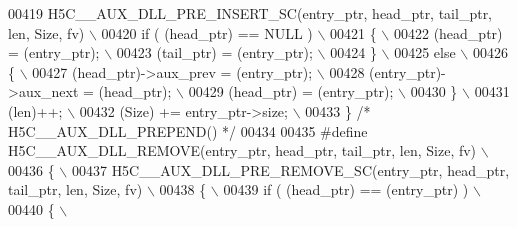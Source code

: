 \begin{DoxyCode}
00419 \textcolor{preprocessor}{    H5C\_\_AUX\_DLL\_PRE\_INSERT\_SC(entry\_ptr, head\_ptr, tail\_ptr, len, Size, fv) \(\backslash\)}
00420 \textcolor{preprocessor}{    if ( (head\_ptr) == NULL )                                                \(\backslash\)}
00421 \textcolor{preprocessor}{    \{                                                                        \(\backslash\)}
00422 \textcolor{preprocessor}{       (head\_ptr) = (entry\_ptr);                                             \(\backslash\)}
00423 \textcolor{preprocessor}{       (tail\_ptr) = (entry\_ptr);                                             \(\backslash\)}
00424 \textcolor{preprocessor}{    \}                                                                        \(\backslash\)}
00425 \textcolor{preprocessor}{    else                                                                     \(\backslash\)}
00426 \textcolor{preprocessor}{    \{                                                                        \(\backslash\)}
00427 \textcolor{preprocessor}{       (head\_ptr)->aux\_prev = (entry\_ptr);                                   \(\backslash\)}
00428 \textcolor{preprocessor}{       (entry\_ptr)->aux\_next = (head\_ptr);                                   \(\backslash\)}
00429 \textcolor{preprocessor}{       (head\_ptr) = (entry\_ptr);                                             \(\backslash\)}
00430 \textcolor{preprocessor}{    \}                                                                        \(\backslash\)}
00431 \textcolor{preprocessor}{    (len)++;                                                                 \(\backslash\)}
00432 \textcolor{preprocessor}{    (Size) += entry\_ptr->size;                                               \(\backslash\)}
00433 \textcolor{preprocessor}{\} }\textcolor{comment}{/* H5C\_\_AUX\_DLL\_PREPEND() */}\textcolor{preprocessor}{}
00434 
00435 \textcolor{preprocessor}{#define H5C\_\_AUX\_DLL\_REMOVE(entry\_ptr, head\_ptr, tail\_ptr, len, Size, fv)    \(\backslash\)}
00436 \textcolor{preprocessor}{\{                                                                            \(\backslash\)}
00437 \textcolor{preprocessor}{    H5C\_\_AUX\_DLL\_PRE\_REMOVE\_SC(entry\_ptr, head\_ptr, tail\_ptr, len, Size, fv) \(\backslash\)}
00438 \textcolor{preprocessor}{    \{                                                                        \(\backslash\)}
00439 \textcolor{preprocessor}{       if ( (head\_ptr) == (entry\_ptr) )                                      \(\backslash\)}
00440 \textcolor{preprocessor}{       \{                                                                     \(\backslash\)}

\end{DoxyCode}

